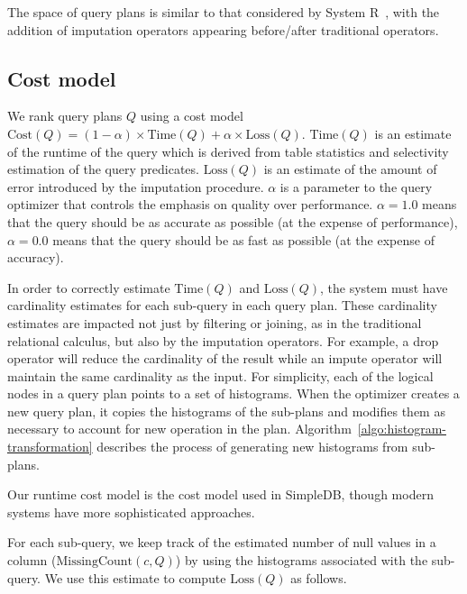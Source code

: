 The space of query plans is similar to that considered by System R~\cite{blasgen1981system}, with the addition of imputation operators appearing before/after traditional operators.

\subsection{Cost model}
\label{sec:cost-model}
We rank query plans $Q$ using a cost model $\text{Cost}(Q) = (1 - \alpha) \times \text{Time}(Q) + \alpha \times \text{Loss}(Q)$. $\text{Time}(Q)$ is an estimate of the runtime of the query which is derived from table statistics and selectivity estimation of the query predicates. $\text{Loss}(Q)$ is an estimate of the amount of error introduced by the imputation procedure. $\alpha$ is a parameter to the query optimizer that controls the emphasis on quality over performance. $\alpha = 1.0$ means that the query should be as accurate as possible (at the expense of performance), $\alpha=0.0$ means that the query should be as fast
as possible (at the expense of accuracy).

In order to correctly estimate $\text{Time}(Q)$ and $\text{Loss}(Q)$, the system must have cardinality estimates for each sub-query in each query plan.
These cardinality estimates are impacted not just by filtering or joining, as in the traditional relational calculus, but also by the imputation operators.
For example, a drop operator will reduce the cardinality of the result while an impute operator will maintain the same cardinality as the input.
For simplicity, each of the logical nodes in a query plan points to a set of histograms.
When the optimizer creates a new query plan, it copies the histograms of the sub-plans and modifies them as necessary to account for new operation in the plan.
Algorithm~\ref{algo:histogram-transformation} describes the process of generating new histograms from sub-plans.

Our runtime cost model is the cost model used in SimpleDB, though modern systems
have more sophisticated approaches.

For each sub-query, we keep track of the estimated number of
null values in a column  ($\text{MissingCount}(c, Q)$) by using the histograms associated with
the sub-query. We use this estimate to compute
$\text{Loss}(Q)$ as follows.

